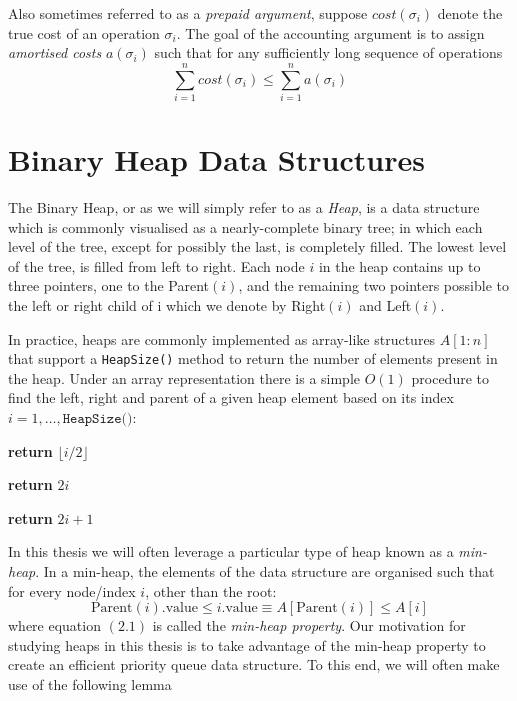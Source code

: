 Also sometimes referred to as a \textit{prepaid argument}, suppose $cost(\sigma_i)$ denote the true cost of an operation $\sigma_i$. The goal of the accounting argument is to assign \textit{amortised costs} $a(\sigma_i)$ such that for any sufficiently long sequence of operations
$$\sum_{i=1}^{n}cost(\sigma_i)\leq\sum_{i=1}^{n}a(\sigma_i)$$


\section{Binary Heap Data Structures}
\label{sec:heap-data-structs}

The Binary Heap, or as we will simply refer to as a \textit{Heap}, is a data structure which is commonly visualised as a nearly-complete binary tree; in which each level of the tree, except for possibly the last, is completely filled. The lowest level of the tree, is filled from left to right. Each node $i$ in the heap contains up to three pointers, one to the Parent$(i)$, and the remaining two pointers possible to the left or right child of i which we denote by Right$(i)$ and Left$(i)$.

In practice, heaps are commonly implemented as array-like structures $A[1:n]$ that support a \texttt{HeapSize()} method to return the number of elements present in the heap. Under an array representation there is a simple $O(1)$ procedure to find the left, right and parent of a given heap element based on its index $i = 1,\dots,\texttt{HeapSize()}$: 
\begin{algorithm}
\begin{algorithmic}[1]
\State \textbf{return} $\lfloor i/2\rfloor$
\EndProcedure
\end{algorithmic}
\end{algorithm}


\begin{algorithm}
\begin{algorithmic}[1]
\State \textbf{return} $2i$
\EndProcedure
\end{algorithmic}
\end{algorithm}

\begin{algorithm}
\begin{algorithmic}[1]
\State \textbf{return} $2i+1$
\EndProcedure
\end{algorithmic}
\end{algorithm}

In this thesis we will often leverage a particular type of heap known as a \textit{min-heap}. In a min-heap, the elements of the data structure are organised such that for every node/index $i$, other than the root:
\begin{equation}
    \text{Parent}(i).\text{value} \leq i.\text{value} \equiv A[\text{Parent}(i)] \leq A[i]
\end{equation}
where equation $(2.1)$ is called the \textit{min-heap property}. Our motivation for studying heaps in this thesis is to take advantage of the min-heap property to create an efficient priority queue data structure. To this end, we will often make use of the following lemma

